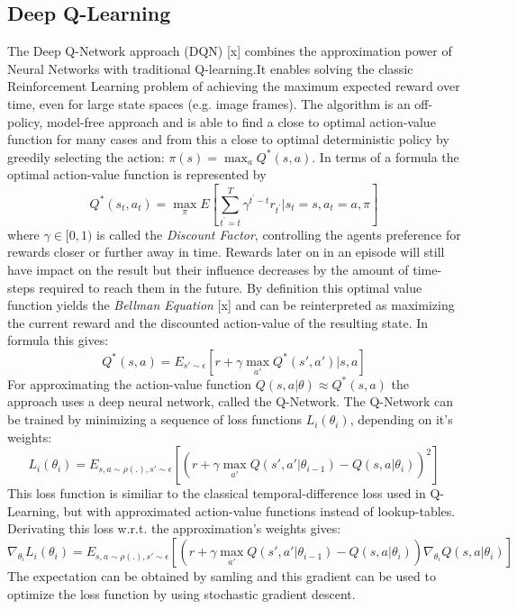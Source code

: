 \subsection{Deep Q-Learning}
\nocite{mnih2015human}
\nocite{mnih2013playing}
\label{sec:DQN}
The Deep Q-Network approach (DQN) [x] combines the approximation power of Neural Networks with traditional Q-learning.It enables solving the classic Reinforcement Learning problem of achieving the maximum expected reward over time, even for large state spaces (e.g. image frames). The algorithm is an off-policy, model-free approach and is able to find a close to optimal action-value function for many cases and from this a close to optimal deterministic policy by greedily selecting the action: $\pi(s)=\max_{a}Q^*(s,a)$. In terms of a formula the optimal action-value function is represented by
\[ 
Q^*(s_t,a_t)=\max_\pi E \left[
\sum_{t^{'}=t}^{T}\gamma^{t^{'}-t}r_{t^{'}}|s_t=s,
a_t=a, \pi \right] 
\]
 where $\gamma\in[0,1)$ is called the \textit{Discount Factor}, controlling the agents preference for rewards closer or further away in time. Rewards later on in an episode will still have impact on the result but their influence decreases by the amount of time-steps required to reach them in the future.
By definition this optimal value function yields the \textit{Bellman Equation} [x] and can be reinterpreted as maximizing the current reward and the discounted action-value of the resulting state. In formula this gives:
\[
Q^*(s,a) = E_{s'\sim\epsilon}\left[
r + \gamma \max_{a'}Q^*(s',a')|s,a \right]
\]
For approximating the action-value function $Q(s,a|\theta)\approx Q^*(s,a)$ the approach uses a deep neural network, called the Q-Network.
The Q-Network can be trained by minimizing a sequence of loss functions $L_i(\theta_i)$, depending on it's weights:
\[
L_i(\theta_i)=E_{s,a\sim\rho(.),s'\sim\epsilon}
\left[\left(r+\gamma \max_{a'} Q(s', 
a'|\theta_{i-1})-Q(s,a|\theta_i)\right)^2\right] 
\]
This loss function is similiar to the classical temporal-difference loss used in Q-Learning, but with approximated action-value functions instead of lookup-tables. Derivating this loss w.r.t. the approximation's weights gives:
\[
\nabla_{\theta_i}L_i(\theta_i)=E_{s,a\sim\rho(.),s'\sim\epsilon}
\left[\left(r+\gamma \max_{a'} Q(s', 
a'|\theta_{i-1})-Q(s,a|\theta_i)\right)\nabla_{\theta_i}Q(s,a|\theta_i)\right] 
\]
The expectation can be obtained by samling and this gradient can be used to optimize the loss function by using stochastic gradient descent.\\
